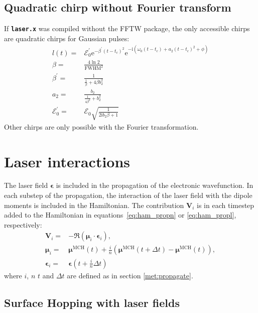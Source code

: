 \documentclass[a4paper,11pt,DIV=15,openany,twoside=false]{scrbook}
\newcommand{\ttt}[1]{\textbf{\texttt{#1}}}
\newcommand{\E}{\ensuremath{\mathrm{e}}}
\newcommand{\I}{\ensuremath{\mathrm{i}}}
\newcommand{\VEC}[1]{\ensuremath{\mathbf{#1}}}
\begin{document}
\subsection{Quadratic chirp without Fourier transform}

If \ttt{laser.x} was compiled without the FFTW package, the only accessible chirps are quadratic chirps for Gaussian pulses:
\begin{align}
  l(t)=&
  \mathcal{E}_0^\prime
  \E^{-\beta^\prime(t-t_c)^2}
  \E^{-\I\left(
    \omega_0(t-t_c)+a_2(t-t_c)^2+\phi
  \right)}\\
  \beta=&\frac{4\ln 2}{\mathrm{FWHM}^2}\\
  \beta^\prime=&\frac{1}{\frac{1}{\beta}+4\beta b_2^2}\\
  a_2=&\frac{b_2}{\frac{1}{4\beta^2}+b^2_2}\\
  \mathcal{E}_0^\prime=&\mathcal{E}_0\sqrt{\frac{1}{2\I b_2\beta+1}}
\end{align}
Other chirps are only possible with the Fourier transformation.


\section{Laser interactions}\label{met:laser}

The laser field $\boldsymbol{\epsilon}$ is included in the propagation of the electronic wavefunction. In each substep of the propagation, the interaction of the laser field with the dipole moments is included in the Hamiltonian. The contribution $\VEC{V}_i$ is in each timestep added to the Hamiltonian in equations~\eqref{eq:ham_propn} or \eqref{eq:ham_propl}, respectively:
\begin{align}
  \VEC{V}_i=&
  -
  \Re\left(
    \boldsymbol{\mu}_i\cdot
    \boldsymbol{\epsilon}_i
  \right),\\
  \boldsymbol{\mu}_i=&
  \boldsymbol{\mu}^{\text{MCH}}(t) + \frac{i}{n}
  \left(
    \boldsymbol{\mu}^{\text{MCH}}(t+\Delta t)-\boldsymbol{\mu}^{\text{MCH}}(t)
  \right),\\
  \boldsymbol{\epsilon}_i=&\boldsymbol{\epsilon}\left(t+\frac{i}{n}\Delta t\right)
\end{align}
where $i$, $n$ $t$ and $\Delta t$ are defined as in section \ref{met:propagate}.

\subsection{Surface Hopping with laser fields}
\end{document}
